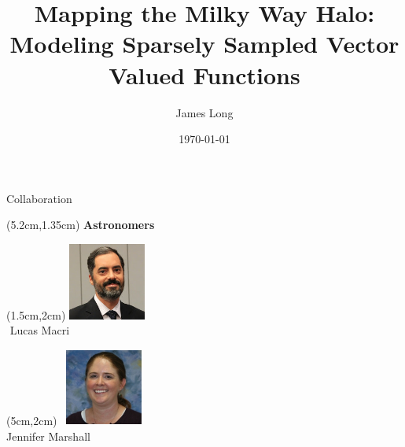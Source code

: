 \documentclass[12pt]{beamer}
\title{Mapping the Milky Way Halo: Modeling Sparsely Sampled Vector Valued Functions}
\author{James Long}
\institute{Texas A\&M University}
\date{\today}
\newcommand{\w}{1in}
\newcommand{\h}{1in}
\begin{document}
\frame{\titlepage}

\begin{frame}{Collaboration}


  \begin{textblock*}{3cm}(5.2cm,1.35cm) %
    \textbf{Astronomers}
  \end{textblock*}
  
  \begin{textblock*}{3cm}(1.5cm,2cm) %
\includegraphics[width=\w,height=\h]{figs/Macri.jpg}\\
$\, \, $Lucas Macri
\end{textblock*}


  \begin{textblock*}{3cm}(5cm,2cm) %
 $\, $ \includegraphics[width=\w,height=\h]{figs/marshall.jpg}\\
Jennifer Marshall
\end{textblock*}


\end{frame}
\end{document}
